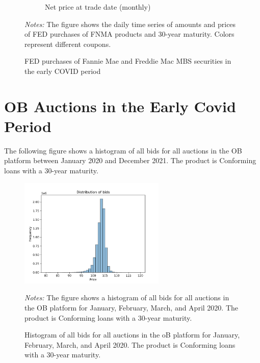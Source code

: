 \documentclass[11pt,a4paper]{article}
\begin{document}
\begin{figure}[h]
\begin{subfigure}[b]{0.49\textwidth}
    \caption{ Net price at trade date (monthly)}
   \end{subfigure}
   \caption{FED purchases of Fannie Mae and Freddie Mac MBS securities  in the early COVID period} 
   \begin{minipage}{\textwidth}
      \footnotesize{\textit{Notes:} The figure shows the daily time series of amounts and prices of FED purchases of FNMA products and 30-year maturity. Colors represent different coupons. } 
      \end{minipage}
\end{figure}


\pagebreak
\section{OB Auctions in the Early Covid Period}


The following figure shows a histogram of all bids for all auctions in the OB platform between January 2020 and December 2021. 
The product is Conforming loans with a 30-year maturity. 



\begin{figure}[h]
    \centering
    \includegraphics[width=0.62\textwidth]{../results/figures/distribution_of_bids.png}
    \caption{Histogram of all bids for all auctions in the oB platform for January, February, March, and April 2020. The product is Conforming loans with a 30-year maturity.}
    \begin{minipage}{\textwidth}
        \footnotesize{\textit{Notes:} The figure shows a histogram of all bids for all auctions in the OB platform for January, February, March, and April 2020. The product is Conforming loans with a 30-year maturity. } 
        \end{minipage}
\end{figure}
\end{document}
